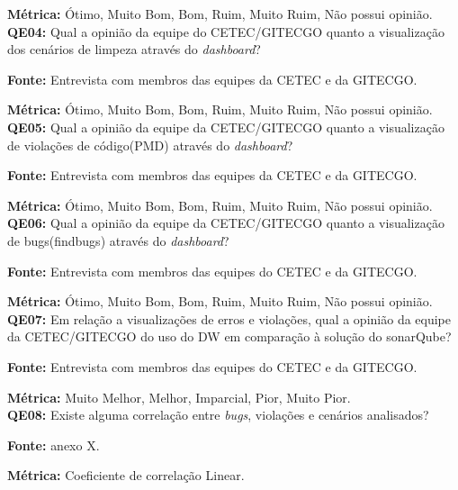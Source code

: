 \textbf{Métrica:} Ótimo, Muito Bom, Bom, Ruim, Muito Ruim, Não possui opinião.\\



\textbf{QE04: } Qual a opinião da equipe do CETEC/GITECGO quanto a visualização dos cenários  de limpeza através do \textit{dashboard}?

\textbf{Fonte:} Entrevista com membros das equipes da CETEC e da GITECGO.

\textbf{Métrica:} Ótimo, Muito Bom, Bom, Ruim, Muito Ruim, Não possui opinião.\\



\textbf{QE05: } Qual a opinião da equipe da CETEC/GITECGO quanto a visualização de violações de código(PMD) através do \textit{dashboard}?

\textbf{Fonte:} Entrevista com membros das equipes da CETEC e da GITECGO.

\textbf{Métrica:} Ótimo, Muito Bom, Bom, Ruim, Muito Ruim, Não possui opinião.\\



\textbf{QE06: } Qual a opinião da equipe da CETEC/GITECGO quanto a visualização de bugs(findbugs) através do \textit{dashboard}?

\textbf{Fonte:} Entrevista com membros das equipes do CETEC e da GITECGO.

\textbf{Métrica:} Ótimo, Muito Bom, Bom, Ruim, Muito Ruim, Não possui opinião.\\




\textbf{QE07: } Em relação a visualizações de erros e violações, qual a opinião da equipe da CETEC/GITECGO do uso do DW em comparação à solução do sonarQube?

\textbf{Fonte:} Entrevista com membros das equipes do CETEC e da GITECGO.

\textbf{Métrica:} Muito Melhor, Melhor, Imparcial, Pior, Muito Pior.\\



\textbf{QE08: } Existe alguma correlação entre \textit{bugs}, violações e cenários analisados? 

\textbf{Fonte:} {\color{red}anexo X}.

\textbf{Métrica:} Coeficiente de correlação Linear.\\


